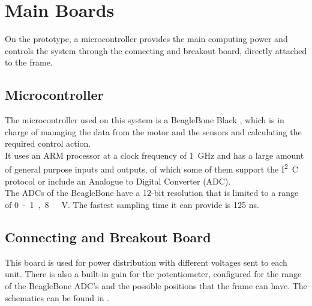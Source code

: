 \section{Main Boards}
On the prototype, a microcontroller provides the main computing power and controls the system through the connecting and breakout board, directly attached to the frame.

\subsection{Microcontroller}
The microcontroller used on this system is a BeagleBone Black \cite{BeagleBone}, which is in charge of managing the data from the motor and the sensors and calculating the required control action.\\
It uses an ARM processor at a clock frequency of \SI{1}{GHz} and has a large amount of general purpose inputs and outputs, of which some of them support the \si{I^2C} protocol or include an Analogue to Digital Converter (ADC).\\
The ADCs of the BeagleBone have a 12-bit resolution that is limited to a range of \si{0 - 1,8\ V}. The fastest sampling time it can provide is \si{125} \si{ns}\cite{Cameon}.

\subsection{Connecting and Breakout Board}
This board is used for power distribution with different voltages sent to each unit. There is also a built-in gain for the potentiometer, configured for the range of the BeagleBone ADC's and the possible positions that the frame can have. The schematics can be found in .

